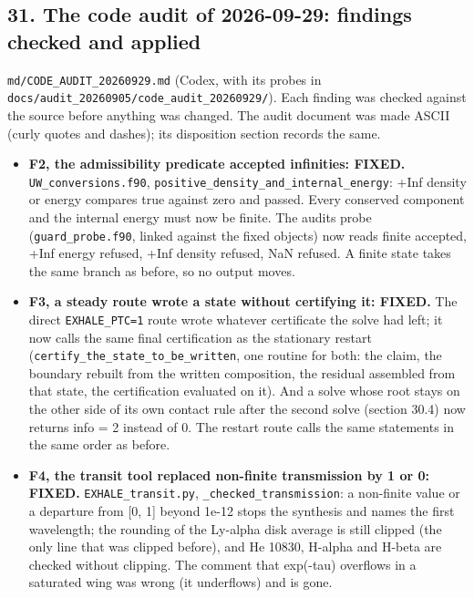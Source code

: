 \documentclass[english,a4paper]{my_memo}
\providecommand{\tightlist}{\setlength{\itemsep}{0pt}\setlength{\parskip}{0pt}}
\begin{document}
\subsection{31. The code audit of 2026-09-29: findings checked and applied}\label{31-the-code-audit-of-2026-09-29-findings-checked-and-applied}

\texttt{md/CODE\_AUDIT\_20260929.md} (Codex, with its probes in
\texttt{docs/audit\_20260905/code\_audit\_20260929/}). Each finding was checked
against the source before anything was changed. The audit document was made
ASCII (curly quotes and dashes); its disposition section records the same.

\begin{itemize}
\tightlist
\item
  \textbf{F2, the admissibility predicate accepted infinities: FIXED.}
  \texttt{UW\_conversions.f90}, \texttt{positive\_density\_and\_internal\_energy}: +Inf density
  or energy compares true against zero and passed. Every conserved component
  and the internal energy must now be finite. The audit\textquotesingle s probe
  (\texttt{guard\_probe.f90}, linked against the fixed objects) now reads
  finite accepted, +Inf energy refused, +Inf density refused, NaN refused.
  A finite state takes the same branch as before, so no output moves.
\item
  \textbf{F3, a steady route wrote a state without certifying it: FIXED.} The
  direct \texttt{EXHALE\_PTC=1} route wrote whatever certificate the solve had left;
  it now calls the same final certification as the stationary restart
  (\texttt{certify\_the\_state\_to\_be\_written}, one routine for both: the claim, the
  boundary rebuilt from the written composition, the residual assembled from
  that state, the certification evaluated on it). And a solve whose root
  stays on the other side of its own contact rule after the second solve
  (section 30.4) now returns info = 2 instead of 0. The restart route calls
  the same statements in the same order as before.
\item
  \textbf{F4, the transit tool replaced non-finite transmission by 1 or 0:
  FIXED.} \texttt{EXHALE\_transit.py}, \texttt{\_checked\_transmission}: a non-finite value
  or a departure from {[}0, 1{]} beyond 1e-12 stops the synthesis and names the
  first wavelength; the rounding of the Ly-alpha disk average is still
  clipped (the only line that was clipped before), and He 10830, H-alpha
  and H-beta are checked without clipping. The comment that exp(-tau)
  overflows in a saturated wing was wrong (it underflows) and is gone.

\end{itemize}
\end{document}
